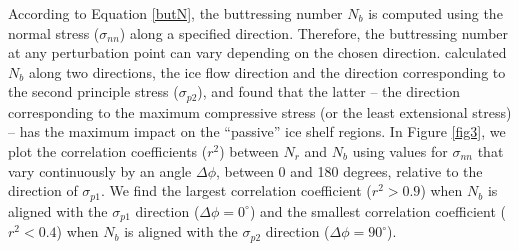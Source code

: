 \documentclass[review,oneside]{igs}
\begin{document}
According to Equation \ref{butN}, the buttressing number $N_b$ is computed using the normal stress ($\sigma_{nn}$) along a specified direction. Therefore, the buttressing number at any perturbation point can vary depending on the chosen direction. \cite{furst2016} calculated $N_b$ along two directions, the ice flow direction and the direction corresponding to the second principle stress ($\sigma_{p2}$), and found that the latter -- the direction corresponding to the maximum compressive stress (or the least extensional stress) -- has the maximum impact on the ``passive'' ice shelf regions. In Figure \ref{fig3}, we plot the correlation coefficients ($r^2$) between $N_r$ and $N_b$ using values for $\sigma_{nn}$ that vary continuously by an angle $\Delta \phi$, between 0 and 180 degrees, relative to the direction of $\sigma_{p1}$. We find the largest correlation coefficient ($r^2>0.9$) when $N_b$ is aligned with the $\sigma_{p1}$ direction ($\Delta \phi=0^\circ$) and the smallest correlation coefficient ($r^2<0.4$) when $N_b$ is aligned with the $\sigma_{p2}$ direction ($\Delta \phi=90^\circ$). 

\end{document}
